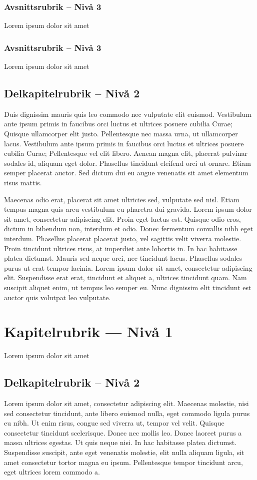 \subsubsection{Avsnittsrubrik -- Nivå 3}
Lorem ipsum dolor sit amet
\subsubsection{Avsnittsrubrik -- Nivå 3}
Lorem ipsum dolor sit amet

\subsection{Delkapitelrubrik -- Nivå 2}

Duis dignissim mauris quis leo commodo nec vulputate elit euismod. Vestibulum ante ipsum primis in faucibus orci luctus et ultrices posuere cubilia Curae; Quisque ullamcorper elit justo. Pellentesque nec massa urna, ut ullamcorper lacus. Vestibulum ante ipsum primis in faucibus orci luctus et ultrices posuere cubilia Curae; Pellentesque vel elit libero. Aenean magna elit, placerat pulvinar sodales id, aliquam eget dolor. Phasellus tincidunt eleifend orci ut ornare. Etiam semper placerat auctor. Sed dictum dui eu augue venenatis sit amet elementum risus mattis.

Maecenas odio erat, placerat sit amet ultricies sed, vulputate sed nisl. Etiam tempus magna quis arcu vestibulum eu pharetra dui gravida. Lorem ipsum dolor sit amet, consectetur adipiscing elit. Proin eget luctus est. Quisque odio eros, dictum in bibendum non, interdum et odio. Donec fermentum convallis nibh eget interdum. Phasellus placerat placerat justo, vel sagittis velit viverra molestie. Proin tincidunt ultrices risus, at imperdiet ante lobortis in. In hac habitasse platea dictumst. Mauris sed neque orci, nec tincidunt lacus. Phasellus sodales purus ut erat tempor lacinia. Lorem ipsum dolor sit amet, consectetur adipiscing elit. Suspendisse erat erat, tincidunt et aliquet a, ultrices tincidunt quam. Nam suscipit aliquet enim, ut tempus leo semper eu. Nunc dignissim elit tincidunt est auctor quis volutpat leo vulputate.

\section{Kapitelrubrik --- Nivå 1}
Lorem ipsum dolor sit amet

\subsection{Delkapitelrubrik -- Nivå 2}
Lorem ipsum dolor sit amet, consectetur adipiscing elit. Maecenas molestie, nisi sed consectetur tincidunt, ante libero euismod nulla, eget commodo ligula purus eu nibh. Ut enim risus, congue sed viverra ut, tempor vel velit. Quisque consectetur tincidunt scelerisque. Donec nec mollis leo. Donec laoreet purus a massa ultrices egestas. Ut quis neque nisi. In hac habitasse platea dictumst. Suspendisse suscipit, ante eget venenatis molestie, elit nulla aliquam ligula, sit amet consectetur tortor magna eu ipsum. Pellentesque tempor tincidunt arcu, eget ultrices lorem commodo a.

